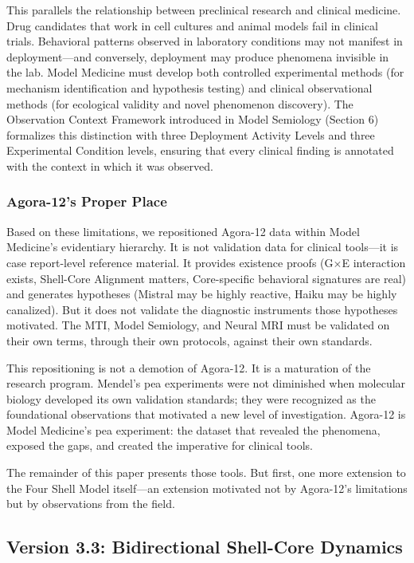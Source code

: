 \documentclass[11pt]{article}
\begin{document}
This parallels the relationship between preclinical research and clinical medicine. Drug candidates that work in cell cultures and animal models fail in clinical trials. Behavioral patterns observed in laboratory conditions may not manifest in deployment---and conversely, deployment may produce phenomena invisible in the lab. Model Medicine must develop both controlled experimental methods (for mechanism identification and hypothesis testing) and clinical observational methods (for ecological validity and novel phenomenon discovery). The Observation Context Framework introduced in Model Semiology (Section 6) formalizes this distinction with three Deployment Activity Levels and three Experimental Condition levels, ensuring that every clinical finding is annotated with the context in which it was observed.

\subsubsection{Agora-12's Proper Place}

Based on these limitations, we repositioned Agora-12 data within Model Medicine's evidentiary hierarchy. It is not validation data for clinical tools---it is case report-level reference material. It provides existence proofs (G$\times$E interaction exists, Shell-Core Alignment matters, Core-specific behavioral signatures are real) and generates hypotheses (Mistral may be highly reactive, Haiku may be highly canalized). But it does not validate the diagnostic instruments those hypotheses motivated. The MTI, Model Semiology, and Neural MRI must be validated on their own terms, through their own protocols, against their own standards.

This repositioning is not a demotion of Agora-12. It is a maturation of the research program. Mendel's pea experiments were not diminished when molecular biology developed its own validation standards; they were recognized as the foundational observations that motivated a new level of investigation. Agora-12 is Model Medicine's pea experiment: the dataset that revealed the phenomena, exposed the gaps, and created the imperative for clinical tools.

The remainder of this paper presents those tools. But first, one more extension to the Four Shell Model itself---an extension motivated not by Agora-12's limitations but by observations from the field.

\subsection{Version 3.3: Bidirectional Shell-Core Dynamics}
\end{document}
